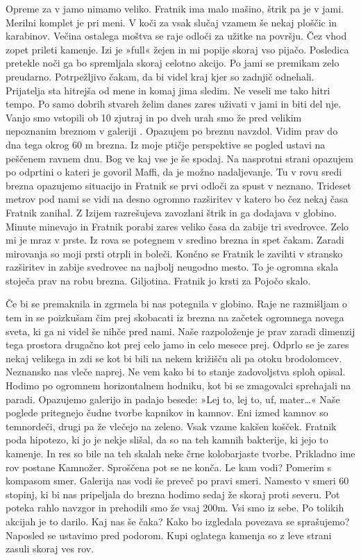   Opreme za v jamo nimamo veliko. Fratnik ima malo mašino, štrik pa je v jami. Merilni komplet je pri meni. V koči za vsak slučaj vzamem še nekaj ploščic in karabinov. Večina ostalega moštva se raje odloči za užitke na površju. Čez vhod zopet prileti kamenje. Izi je »full« žejen in mi popije skoraj vso pijačo. Posledica pretekle noči ga bo spremljala skoraj celotno akcijo. Po jami se premikam zelo preudarno. Potrpežljivo čakam, da bi videl kraj kjer so zadnjič odnehali. Prijatelja sta hitrejša od mene in komaj jima sledim. Ne veseli me tako hitri tempo. Po samo dobrih stvareh želim danes zares uživati v jami in biti del nje. Vanjo smo vstopili ob 10  zjutraj in po dveh urah smo že pred velikim nepoznanim breznom v galeriji . Opazujem po breznu navzdol. Vidim prav do dna tega okrog 60 m brezna. Iz moje ptičje perspektive se pogled ustavi na peščenem ravnem dnu. Bog ve kaj vse je še spodaj. Na nasprotni strani opazujem po odprtini o kateri je govoril Maffi, da je možno nadaljevanje. Tu v rovu sredi brezna opazujemo situacijo in Fratnik se prvi odloči za spust v neznano. Trideset metrov pod nami se vidi na desno ogromno razširitev v katero bo čez nekaj časa Fratnik zanihal. Z Izijem razrešujeva zavozlani štrik in ga dodajava v globino. Minute minevajo in Fratnik porabi zares veliko časa da zabije tri svedrovce. Zelo mi je mraz v prste. Iz rova se potegnem v sredino brezna in spet čakam. Zaradi mirovanja so moji prsti otrpli in boleči. Končno se Fratnik le zavihti v stransko razširitev in zabije svedrovec na najbolj neugodno mesto. To je ogromna skala stoječa prav na robu brezna. Giljotina. Fratnik jo krsti za Pojočo skalo. 

Če bi se premaknila in zgrmela bi nas potegnila v globino. Raje ne razmišljam o tem in se poizkušam čim prej skobacati iz brezna na začetek ogromnega novega sveta, ki ga ni videl še nihče pred nami. Naše razpoloženje je prav zaradi dimenzij tega prostora drugačno kot prej celo jamo in celo mesece prej. Odprlo se je zares nekaj velikega in zdi se kot bi bili na nekem križišču ali pa otoku brodolomcev. Neznansko nas vleče naprej. Ne vem kako bi to stanje zadovoljstva sploh opisal. Hodimo po ogromnem horizontalnem hodniku, kot bi se zmagovalci sprehajali na paradi. Opazujemo galerijo in padajo besede: »Lej to, lej to, uf, mater…« Naše poglede pritegnejo čudne tvorbe kapnikov in kamnov. Eni izmed kamnov so temnordeči, drugi pa že vlečejo na zeleno. Vsak vzame kakšen košček. Fratnik poda hipotezo, ki jo je nekje slišal, da so na teh kamnih bakterije, ki jejo to kamenje. In res so bile na teh skalah neke črne kolobarjaste tvorbe. Prikladno ime rov postane Kamnožer.  Sproščena pot se ne konča. Le kam vodi? Pomerim s kompasom smer. Galerija nas vodi še preveč po pravi smeri. Namesto v smeri 60 stopinj, ki bi nas pripeljala do brezna  hodimo sedaj že skoraj proti severu. Pot poteka rahlo navzgor in prehodili smo že vsaj 200m. Vsi smo iz sebe. Po tolikih akcijah je to darilo. Kaj nas še čaka? Kako bo izgledala povezava se sprašujemo? Naposled se ustavimo pred podorom. Kupi oglatega kamenja so z leve strani zasuli skoraj ves rov. 


